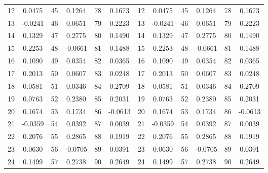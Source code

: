 \documentclass{article}
\begin{document}
\begin{table}[H]
\begin{tabular}{cccccccccccc}
		12       & 0.0475        & 45            & 0.1264            & 78  & 0.1673  & 12       & 0.0475        & 45            & 0.1264            & 78  & 0.1673  \\
		13       & -0.0241       & 46            & 0.0651            & 79  & 0.2223  & 13       & -0.0241       & 46            & 0.0651            & 79  & 0.2223  \\
		14       & 0.1329        & 47            & 0.2775            & 80  & 0.1490  & 14       & 0.1329        & 47            & 0.2775            & 80  & 0.1490  \\
		15       & 0.2253        & 48            & -0.0661           & 81  & 0.1488  & 15       & 0.2253        & 48            & -0.0661           & 81  & 0.1488  \\
		16       & 0.1090        & 49            & 0.0354            & 82  & 0.0365  & 16       & 0.1090        & 49            & 0.0354            & 82  & 0.0365  \\
		17       & 0.2013        & 50            & 0.0607            & 83  & 0.0248  & 17       & 0.2013        & 50            & 0.0607            & 83  & 0.0248  \\
		18       & 0.0581        & 51            & 0.0346            & 84  & 0.2709  & 18       & 0.0581        & 51            & 0.0346            & 84  & 0.2709  \\
		19       & 0.0763        & 52            & 0.2380            & 85  & 0.2031  & 19       & 0.0763        & 52            & 0.2380            & 85  & 0.2031  \\
		20       & 0.1674        & 53            & 0.1734            & 86  & -0.0613 & 20       & 0.1674        & 53            & 0.1734            & 86  & -0.0613 \\
		21       & -0.0359       & 54            & 0.0392            & 87  & 0.0039  & 21       & -0.0359       & 54            & 0.0392            & 87  & 0.0039  \\
		22       & 0.2076        & 55            & 0.2865            & 88  & 0.1919  & 22       & 0.2076        & 55            & 0.2865            & 88  & 0.1919  \\
		23       & 0.0630        & 56            & -0.0705           & 89  & 0.0391  & 23       & 0.0630        & 56            & -0.0705           & 89  & 0.0391  \\
		24       & 0.1499        & 57            & 0.2738            & 90  & 0.2649  & 24       & 0.1499        & 57            & 0.2738            & 90  & 0.2649  \\

\end{tabular}
\end{table}
\end{document}
